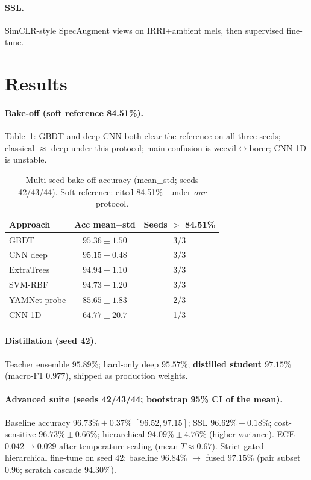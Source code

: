 \documentclass{article}
\begin{document}
\paragraph{SSL.}
SimCLR-style SpecAugment views on IRRI+ambient mels, then supervised fine-tune.

\section{Results}
\paragraph{Bake-off (soft reference 84.51\%).}
Table~\ref{tab:bakeoff}: GBDT and deep CNN both clear the reference on all three seeds; classical $\approx$ deep under this protocol; main confusion is weevil$\leftrightarrow$borer; CNN-1D is unstable.

\begin{table}[t]
\centering
\caption{Multi-seed bake-off accuracy (mean$\pm$std; seeds 42/43/44). Soft reference: cited 84.51\%~\cite{balingbing2024} under \emph{our} protocol.}
\label{tab:bakeoff}
\small
\begin{tabular}{lcc}
\toprule
Approach & Acc mean$\pm$std & Seeds $>$ 84.51\% \\
\midrule
GBDT & $95.36\pm1.50$ & 3/3 \\
CNN deep & $95.15\pm0.48$ & 3/3 \\
ExtraTrees & $94.94\pm1.10$ & 3/3 \\
SVM-RBF & $94.73\pm1.20$ & 3/3 \\
YAMNet probe & $85.65\pm1.83$ & 2/3 \\
CNN-1D & $64.77\pm20.7$ & 1/3 \\
\bottomrule
\end{tabular}
\end{table}

\paragraph{Distillation (seed 42).}
Teacher ensemble $95.89\%$; hard-only deep $95.57\%$; \textbf{distilled student $97.15\%$} (macro-F1 $0.977$), shipped as production weights.

\paragraph{Advanced suite (seeds 42/43/44; bootstrap 95\% CI of the mean).}
Baseline accuracy $96.73\%\pm0.37\%$ $[96.52,97.15]$; SSL $96.62\%\pm0.18\%$; cost-sensitive $96.73\%\pm0.66\%$; hierarchical $94.09\%\pm4.76\%$ (higher variance).
ECE $0.042\rightarrow0.029$ after temperature scaling (mean $T{\approx}0.67$).
Strict-gated hierarchical fine-tune on seed 42: baseline $96.84\%$ $\rightarrow$ fused $97.15\%$ (pair subset $0.96$; scratch cascade $94.30\%$).
\end{document}
